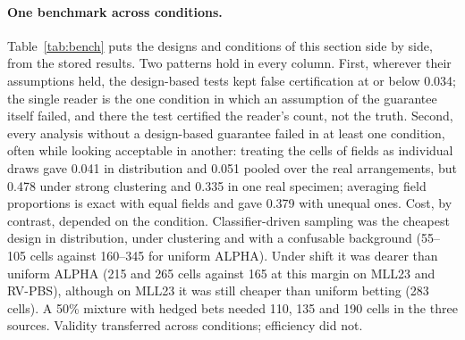 \documentclass[11pt]{article}
\theoremstyle{remark}
\theoremstyle{definition}
\begin{document}
\paragraph{One benchmark across conditions.} Table~\ref{tab:bench} puts the designs and conditions of this section side by side, from the stored results. Two patterns hold in every column. First, wherever their assumptions held, the design-based tests kept false certification at or below 0.034; the single reader is the one condition in which an assumption of the guarantee itself failed, and there the test certified the reader's count, not the truth. Second, every analysis without a design-based guarantee failed in at least one condition, often while looking acceptable in another: treating the cells of fields as individual draws gave 0.041 in distribution and 0.051 pooled over the real arrangements, but 0.478 under strong clustering and 0.335 in one real specimen; averaging field proportions is exact with equal fields and gave 0.379 with unequal ones. Cost, by contrast, depended on the condition. Classifier-driven sampling was the cheapest design in distribution, under clustering and with a confusable background (55--105 cells against 160--345 for uniform ALPHA). Under shift it was dearer than uniform ALPHA (215 and 265 cells against 165 at this margin on MLL23 and RV-PBS), although on MLL23 it was still cheaper than uniform betting (283 cells). A 50\% mixture with hedged bets needed 110, 135 and 190 cells in the three sources. Validity transferred across conditions; efficiency did not.
\end{document}
